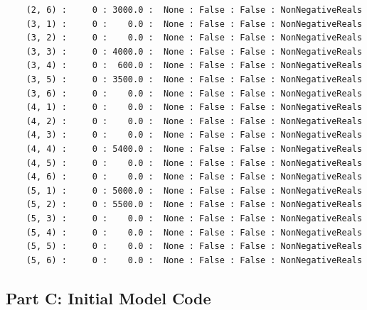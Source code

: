 \documentclass[12pt]{article}
\begin{document}
\begin{verbatim}
    (2, 6) :     0 : 3000.0 :  None : False : False : NonNegativeReals
    (3, 1) :     0 :    0.0 :  None : False : False : NonNegativeReals
    (3, 2) :     0 :    0.0 :  None : False : False : NonNegativeReals
    (3, 3) :     0 : 4000.0 :  None : False : False : NonNegativeReals
    (3, 4) :     0 :  600.0 :  None : False : False : NonNegativeReals
    (3, 5) :     0 : 3500.0 :  None : False : False : NonNegativeReals
    (3, 6) :     0 :    0.0 :  None : False : False : NonNegativeReals
    (4, 1) :     0 :    0.0 :  None : False : False : NonNegativeReals
    (4, 2) :     0 :    0.0 :  None : False : False : NonNegativeReals
    (4, 3) :     0 :    0.0 :  None : False : False : NonNegativeReals
    (4, 4) :     0 : 5400.0 :  None : False : False : NonNegativeReals
    (4, 5) :     0 :    0.0 :  None : False : False : NonNegativeReals
    (4, 6) :     0 :    0.0 :  None : False : False : NonNegativeReals
    (5, 1) :     0 : 5000.0 :  None : False : False : NonNegativeReals
    (5, 2) :     0 : 5500.0 :  None : False : False : NonNegativeReals
    (5, 3) :     0 :    0.0 :  None : False : False : NonNegativeReals
    (5, 4) :     0 :    0.0 :  None : False : False : NonNegativeReals
    (5, 5) :     0 :    0.0 :  None : False : False : NonNegativeReals
    (5, 6) :     0 :    0.0 :  None : False : False : NonNegativeReals
\end{verbatim}

\subsection{Part C: Initial Model Code}

\end{document}
